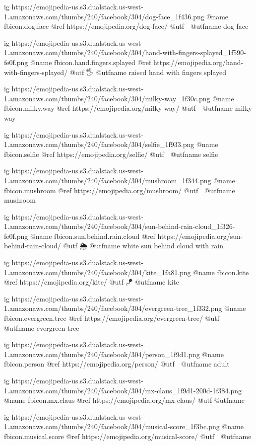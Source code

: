  ig https://emojipedia-us.s3.dualstack.us-west-1.amazonaws.com/thumbs/240/facebook/304/dog-face_1f436.png
  @name fbicon.dog.face
  @ref https://emojipedia.org/dog-face/
  @utf 🐶
  @utfname dog face



  ig https://emojipedia-us.s3.dualstack.us-west-1.amazonaws.com/thumbs/240/facebook/304/hand-with-fingers-splayed_1f590-fe0f.png
  @name fbicon.hand.fingers.splayed
  @ref https://emojipedia.org/hand-with-fingers-splayed/
  @utf 🖐
  @utfname raised hand with fingers splayed

  ig https://emojipedia-us.s3.dualstack.us-west-1.amazonaws.com/thumbs/240/facebook/304/milky-way_1f30c.png
  @name fbicon.milky.way
  @ref https://emojipedia.org/milky-way/
  @utf 🌌
  @utfname milky way

  ig https://emojipedia-us.s3.dualstack.us-west-1.amazonaws.com/thumbs/240/facebook/304/selfie_1f933.png
  @name fbicon.selfie
  @ref https://emojipedia.org/selfie/
  @utf 🤳
  @utfname selfie

  ig https://emojipedia-us.s3.dualstack.us-west-1.amazonaws.com/thumbs/240/facebook/304/mushroom_1f344.png
  @name fbicon.mushroom
  @ref https://emojipedia.org/mushroom/
  @utf 🍄
  @utfname mushroom

  ig https://emojipedia-us.s3.dualstack.us-west-1.amazonaws.com/thumbs/240/facebook/304/sun-behind-rain-cloud_1f326-fe0f.png
  @name fbicon.sun.behind.rain.cloud
  @ref https://emojipedia.org/sun-behind-rain-cloud/
  @utf 🌦
  @utfname white sun behind cloud with rain

  ig https://emojipedia-us.s3.dualstack.us-west-1.amazonaws.com/thumbs/240/facebook/304/kite_1fa81.png
  @name fbicon.kite
  @ref https://emojipedia.org/kite/
  @utf 🪁
  @utfname kite

  ig https://emojipedia-us.s3.dualstack.us-west-1.amazonaws.com/thumbs/240/facebook/304/evergreen-tree_1f332.png
  @name fbicon.evergreen.tree
  @ref https://emojipedia.org/evergreen-tree/
  @utf 🌲
  @utfname evergreen tree

  ig https://emojipedia-us.s3.dualstack.us-west-1.amazonaws.com/thumbs/240/facebook/304/person_1f9d1.png
  @name fbicon.person
  @ref https://emojipedia.org/person/
  @utf 🧑
  @utfname adult

  ig https://emojipedia-us.s3.dualstack.us-west-1.amazonaws.com/thumbs/240/facebook/304/mx-claus_1f9d1-200d-1f384.png
  @name fbicon.mx.claus
  @ref https://emojipedia.org/mx-claus/
  @utf
  @utfname

  ig https://emojipedia-us.s3.dualstack.us-west-1.amazonaws.com/thumbs/240/facebook/304/musical-score_1f3bc.png
  @name fbicon.musical.score
  @ref https://emojipedia.org/musical-score/
  @utf 🎼
  @utfname

